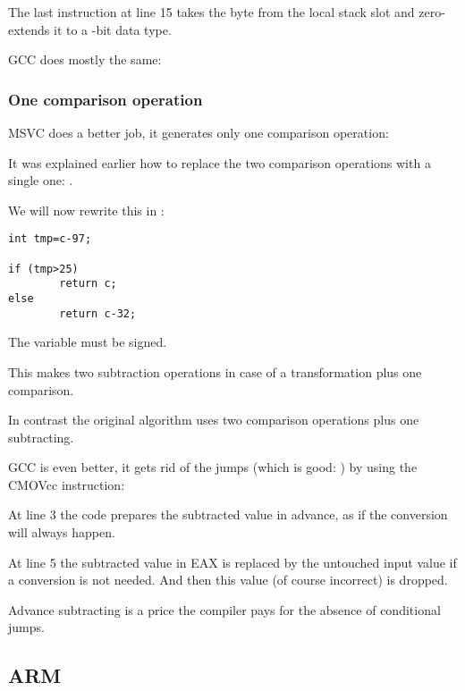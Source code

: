 The last  instruction at line 15 takes the byte from the local stack slot and zero-extends it to a -bit data type.

\NonOptimizing GCC does mostly the same:



\subsubsection{One comparison operation}
\label{toupper_one_comparison}

\Optimizing MSVC does a better job, it generates only one comparison operation:



It was explained earlier how to replace the two comparison operations with a single one: .

We will now rewrite this in \CCpp:

\begin{lstlisting}
int tmp=c-97;

if (tmp>25)
        return c;
else
        return c-32;
\end{lstlisting}

The  variable must be signed.

This makes two subtraction operations in case of a transformation plus one comparison.

In contrast the original algorithm uses two comparison operations plus one subtracting.

\Optimizing GCC is even better, it gets rid of the jumps (which is good: ) 
by using the CMOVcc instruction:



At line 3 the code prepares the subtracted value in advance, as if the conversion will always happen.

At line 5 the subtracted value in EAX is replaced by the untouched input value if a conversion is not needed.
And then this value (of course incorrect) is dropped.

Advance subtracting is a price the compiler pays for the absence of conditional jumps.

\subsection{ARM}

